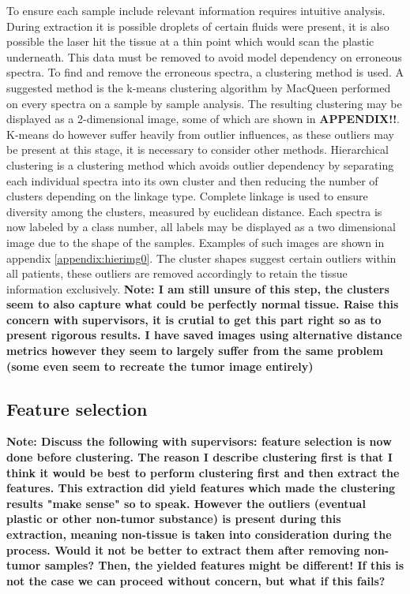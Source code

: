 To ensure each sample include relevant information requires intuitive analysis. During extraction it is possible droplets of certain fluids were present, it is also possible the laser hit the tissue at a thin point which would scan the plastic underneath. This data must be removed to avoid model dependency on erroneous spectra. To find and remove the erroneous spectra, a clustering method is used. A suggested method is the k-means clustering algorithm by MacQueen \cite{macqueen} performed on every spectra on a sample by sample analysis. The resulting clustering may be displayed as a 2-dimensional image, some of which are shown in \textbf{APPENDIX!!}. K-means do however suffer heavily from outlier influences, as these outliers may be present at this stage, it is necessary to consider other methods. Hierarchical clustering is a clustering method which avoids outlier dependency by separating each individual spectra into its own cluster and then reducing the number of clusters depending on the linkage type. Complete linkage is used to ensure diversity among the clusters, measured by euclidean distance\cite{scikit}. Each spectra is now labeled by a class number, all labels may be displayed as a two dimensional image due to the shape of the samples. Examples of such images are shown in appendix \ref{appendix:hierimg0}. The cluster shapes suggest certain outliers within all patients, these outliers are removed accordingly to retain the tissue information exclusively. \textbf{Note: I am still unsure of this step, the clusters seem to also capture what could be perfectly normal tissue. Raise this concern with supervisors, it is crutial to get this part right so as to present rigorous results. I have saved images using alternative distance metrics however they seem to largely suffer from the same problem (some even seem to recreate the tumor image entirely)}

\subsection{Feature selection}

\textbf{Note: Discuss the following with supervisors: feature selection is now done before clustering. The reason I describe clustering first is that I think it would be best to perform clustering first and then extract the features. This extraction did yield features which made the clustering results "make sense" so to speak. However the outliers (eventual plastic or other non-tumor substance) is present during this extraction, meaning non-tissue is taken into consideration during the process. Would it not be better to extract them after removing non-tumor samples? Then, the yielded features might be different! If this is not the case we can proceed without concern, but what if this fails?}
\\

